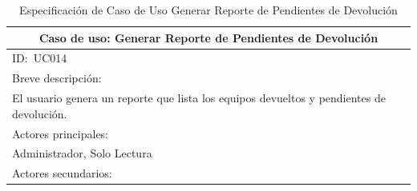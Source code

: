 \documentclass[stu, 12pt, letterpaper, donotrepeattitle, floatsintext, natbib]{apa7}
\begin{document}
\begin{longtable}{@{} p{16.5cm} @{}}
    \caption{Especificaci\'on de Caso de Uso Generar Reporte de Pendientes de Devoluci\'on}\label{tab:UC014}                                                                                                                                                                         \\ \toprule
    \multicolumn{1}{c}{Caso de uso: Generar Reporte de Pendientes de Devoluci\'on}                                                                                                                                                                                                   \\ \midrule
    ID:~UC014                                                                                                                                                                                                                                                                        \\ \midrule
    Breve descripci\'on:                                                                                                                                                                                                                                                             \\
    El usuario genera un reporte que lista los equipos devueltos y pendientes de devoluci\'on.                                                                                                                                                                                       \\ \midrule
    Actores principales:                                                                                                                                                                                                                                                             \\
    Administrador, Solo Lectura                                                                                                                                                                                                                                                      \\ \midrule
    Actores secundarios:                                                                                                                                                                                                                                                             \\

\end{longtable}
\end{document}
